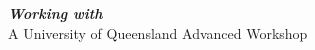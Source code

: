 \textbf{\textit{Working with \Rlogo}}\\[0.5cm]
A University of Queensland Advanced Workshop\\[0.5cm]

